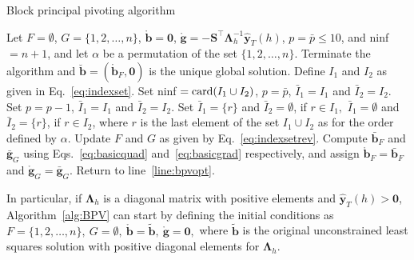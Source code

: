 \documentclass[11pt]{article}
\newcommand{\0}{\phantom{0}}
\begin{document}
\begin{algorithm}
	\caption{Block principal pivoting algorithm}
	\label{alg:BPV}
	\begin{spacing}{1.3}
		\begin{algorithmic}[1]
			\Require Let $F = \emptyset$, $G = \{1, 2, \dots, n\}$, $\mathring{\bm{b}} = \bm{0}$, $\mathring{\bm{g}} = -\bm{S}^\top\bm{\Lambda}_{h}^{-1}\hat{\bm{y}}_{T}(h)$, $p = \bar{p} \leq 10$, and ninf $= n + 1$, and let $\alpha$ be a permutation of the set $\{1, 2, \dots, n\}$.
			 \label{line:bpvopt}
			\State Terminate the algorithm and $\breve{\bm{b}} = (\mathring{\bm{b}}_{F}, \bm{0})$ is the unique global solution.
			\Else{}
			\State Define $I_{1}$ and $I_{2}$ as given in Eq.~\eqref{eq:indexset}.
			\State Set ninf $= \textnormal{card}(I_{1} \cup I_{2})$, $p = \bar{p}$, $\bar{I}_{1} = I_{1}$ and $\bar{I}_{2} = I_{2}$.
			\State Set $p = p - 1$, $\bar{I}_{1} = I_{1}$ and $\bar{I}_{2} = I_{2}$.
			\State Set $\bar{I}_{1} = \{r\}$ and $\bar{I}_{2} = \emptyset$, if $r \in I_{1},$
			\State \hspace{5.3mm} $\bar{I}_{1} = \emptyset $ and $\bar{I}_{2} = \{r\}$, if $r \in I_{2}$,
			\State where $r$ is the last element of the set $I_{1} \cup I_{2}$ as for the order defined by $\alpha$.
			\EndIf
			\State Update $F$ and $G$ as given by Eq.~\eqref{eq:indexsetrev}.
			\State Compute $\bar{\bm{b}}_{F}$ and $\bar{\bm{g}}_{G}$ using Eqs.~\eqref{eq:basicquad} and~\eqref{eq:basicgrad} respectively, and assign $\mathring{\bm{b}}_{F} = \bar{\bm{b}}_{F}$ and $\mathring{\bm{g}}_{G} = \bar{\bm{g}}_{G}$.
			\State Return to line~\ref{line:bpvopt}.
			\EndIf
		\end{algorithmic}
	\end{spacing}
\end{algorithm}


In particular, if $\bm{\Lambda}_{h}$ is a diagonal matrix with positive elements and $\hat{\bm{y}}_{T}(h) > \bm{0}$, Algorithm~\ref{alg:BPV} can start by defining the initial conditions as $
	F = \{1, 2, \dots, n\},\ G = \emptyset,\ \mathring{\bm{b}} = \tilde{\bm{b}},\ \mathring{\bm{g}} = \bm{0},$
where $\tilde{\bm{b}}$ is the original unconstrained least squares solution with positive diagonal elements for $\bm{\Lambda}_{h}$.
\end{document}
